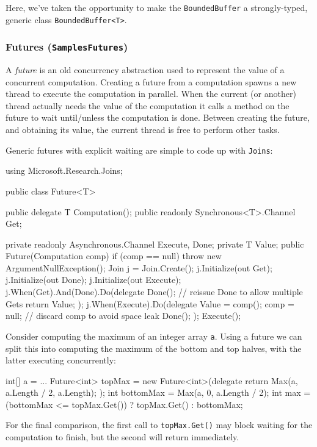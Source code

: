 \documentclass{article}
\newcommand{\sample}[1]{\texorpdfstring{{(\texttt{Samples{\symbol{92}}#1})}}{}}
\newcommand{\joins}{{\texttt{Joins}}}
\begin{document}
Here, we've taken the opportunity to make the \verb+BoundedBuffer+ a strongly-typed, generic class \verb+BoundedBuffer<T>+.

\subsubsection{Futures \sample{Futures}}

A \emph{future} is an old concurrency abstraction used to represent the 
value of a concurrent computation.
Creating a future from a computation spawns a new thread to execute the computation in parallel. When the current (or another) thread actually needs the value of the computation it calls a method on the future to wait until/unless the computation is done. Between creating the future, and obtaining its value,
the current thread is free to perform other tasks.

Generic futures with explicit waiting are simple to code up with \joins:

\begin{lstcsharp}
using Microsoft.Research.Joins;

public class Future<T> {
  public delegate T Computation();
  public readonly Synchronous<T>.Channel Get;

  private readonly Asynchronous.Channel Execute, Done;
  private T Value;
  public Future(Computation comp) {
    if (comp == null) throw new ArgumentNullException();
    Join j = Join.Create();
    j.Initialize(out Get);
    j.Initialize(out Done);
    j.Initialize(out Execute);
    j.When(Get).And(Done).Do(delegate
    {
      Done(); // reissue Done to allow multiple Gets
      return Value;
    });
    j.When(Execute).Do(delegate
    {
      Value = comp();
      comp = null; // discard comp to avoid space leak
      Done();
    });
    Execute();
  }
}
\end{lstcsharp}

Consider computing the maximum of an integer array \texttt{a}. 
Using a future we can split this into computing the maximum of the bottom and top halves, with the latter executing concurrently:

\begin{lstcsharp}
int[] a = ...
Future<int> topMax = 
  new Future<int>(delegate { return Max(a, a.Length / 2, a.Length); });
int bottomMax = Max(a, 0, a.Length / 2);
int max = (bottomMax <= topMax.Get()) ? topMax.Get() : bottomMax;
\end{lstcsharp}

For the final comparison, the first call to \texttt{topMax.Get()}
may block waiting for the computation to finish, but the second 
will return immediately.
\end{document}
